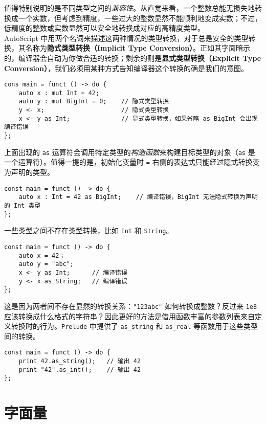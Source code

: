 值得特别说明的是不同类型之间的\emph{兼容性}。从直觉来看，一个整数总能无损失地转换成一个实数，但考虑到精度，一些过大的整数显然不能顺利地变成实数；不过，低精度的整数或实数显然可以安全地转换成对应的高精度类型。 \\

AutoScript 中用两个名词来描述这两种情况的类型转换，对于总是安全的类型转换，其名称为\textbf{隐式类型转换（Implicit Type Conversion）}。正如其字面暗示的，编译器会自动为你做合适的转换；剩余的则是\textbf{显式类型转换（Explicit Type Conversion）}，我们必须用某种方式告知编译器这个转换的确是我们的意图。

\begin{lstlisting}
cons main = funct () -> do {
    auto x : mut Int = 42;
    auto y : mut BigInt = 0;	// 隐式类型转换
    y <- x;             		// 隐式类型转换
    x <- y as Int;      		// 显式类型转换，如果省略 as BigInt 会出现编译错误
};
\end{lstlisting}

上面出现的 \lstinline!as! 运算符会调用特定类型的\emph{构造函数}来构建目标类型的对象（\lstinline!as! 是一个运算符）。值得一提的是，初始化变量时 \lstinline!=! 右侧的表达式只能经过隐式转换变为声明的类型。

\begin{lstlisting}
const main = funct () -> do {
    auto x : Int = 42 as BigInt;    // 编译错误，BigInt 无法隐式转换为声明的 Int 类型
};
\end{lstlisting}

一些类型之间不存在类型转换，比如 \lstinline!Int! 和 \lstinline!String!。

\begin{lstlisting}
const main = funct () -> do {
    auto x = 42；
    auto y = "abc";
    x <- y as Int;      // 编译错误
    y <- x as String;   // 编译错误
};
\end{lstlisting}

这是因为两者间不存在显然的转换关系：\lstinline!"123abc"! 如何转换成整数？反过来 \lstinline!1e8! 应该转换成什么格式的字符串？因此更好的方法是借用函数丰富的参数列表来自定义转换时的行为。\lstinline!Prelude! 中提供了 \texttt{as\_string} 和 \texttt{as\_real} 等函数用于这些类型间的转换。

\begin{lstlisting}
const main = funct () -> do {
	print 42.as_string();	// 输出 42
	print "42".as_int();	// 输出 42
};
\end{lstlisting}

\section{字面量}

